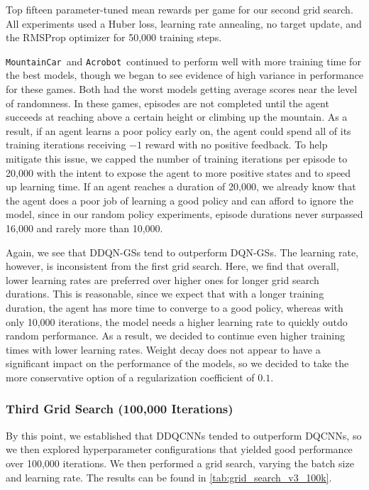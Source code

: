 \documentclass[11pt]{article}
\newcommand{\ab}{\texttt{Acrobot}}
\newcommand{\mc}{\texttt{MountainCar}}
\begin{document}
\begin{table}[!ht]
  \footnotesize
  \centering
  
  
  \caption{Top fifteen parameter-tuned mean rewards per game for our second grid search. All experiments used a Huber loss, learning rate annealing, no target update, and the RMSProp optimizer for 50,000 training steps.}
  \label{tab:grid_search_v2_50k}
\end{table}

\mc~and \ab~continued to perform well with more training time for the best models, though we began to see evidence of high variance in performance for these games. Both had the worst models getting average scores near the level of randomness. In these games, episodes are not completed until the agent succeeds at reaching above a certain height or climbing up the mountain. As a result, if an agent learns a poor policy early on, the agent could spend all of its training iterations receiving $-1$ reward with no positive feedback. To help mitigate this issue, we capped the number of training iterations per episode to 20,000 with the intent to expose the agent to more positive states and to speed up learning time. If an agent reaches a duration of 20,000, we already know that the agent does a poor job of learning a good policy and can afford to ignore the model, since in our random policy experiments, episode durations never surpassed 16,000 and rarely more than 10,000.

Again, we see that DDQN-GSs tend to outperform DQN-GSs. The learning rate, however, is inconsistent from the first grid search. Here, we find that overall, lower learning rates are preferred over higher ones for longer grid search durations. This is reasonable, since we expect that with a longer training duration, the agent has more time to converge to a good policy, whereas with only 10,000 iterations, the model needs a higher learning rate to quickly outdo random performance. As a result, we decided to continue even higher training times with lower learning rates. Weight decay does not appear to have a significant impact on the performance of the models, so we decided to take the more conservative option of a regularization coefficient of $0.1$.

\subsubsection{Third Grid Search (100,000 Iterations)}

By this point, we established that DDQCNNs tended to outperform DQCNNs, so we then explored hyperparameter configurations that yielded good performance over 100,000 iterations. We then performed a grid search, varying the batch size and learning rate. The results can be found in \ref{tab:grid_search_v3_100k}.
\end{document}
